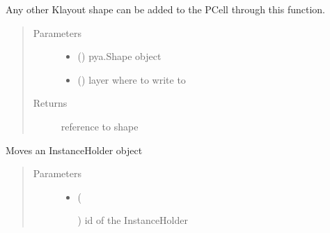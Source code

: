 \documentclass[a4paper,10pt,english]{sphinxmanual}
\begin{document}
\begin{fulllineitems}
\begin{fulllineitems}
\begin{quote}
\begin{description}
\end{description}\end{quote}

\end{fulllineitems}


\begin{fulllineitems}
\label{\detokenize{photonics:kppc.photonics.PhotDevice.insert_shape}}
Any other Klayout shape can be added to the PCell through this function.
\begin{quote}\begin{description}
\item[{Parameters}] \leavevmode\begin{itemize}
\item {} 
 () \textendash{} pya.Shape object

\item {} 
 () \textendash{} layer where to write to

\end{itemize}

\item[{Returns}] \leavevmode
reference to shape

\end{description}\end{quote}

\end{fulllineitems}


\begin{fulllineitems}
\label{\detokenize{photonics:kppc.photonics.PhotDevice.move_instance}}
Moves an InstanceHolder object
\begin{quote}\begin{description}
\item[{Parameters}] \leavevmode\begin{itemize}
\item {} 
 (%
\begin{footnote}[58]\sphinxAtStartFootnote
{}
%
\end{footnote}) \textendash{} id of the InstanceHolder


\end{itemize}
\end{description}
\end{quote}
\end{fulllineitems}
\end{fulllineitems}
\end{document}
